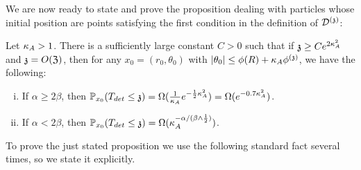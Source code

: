 We are now ready to state and prove the proposition dealing with particles whose initial position are points satisfying the first condition in the definition of $\dt$:
\begin{proposition}\label{mixedLowerBoundschico}
Let $\KA > 1$. There is a sufficiently large constant $C>0$ such that if $\ss\ge Ce^{2\KA^2}$ and $\ss=O(\mathfrak{Z})$, then for any $x_0=(r_0, \theta_0)$ with $|\theta_0| \le \phi(R)+\KA \phis$, we have the following: 
\begin{enumerate}[(i)]

\item\label{mixedLowerBoundschico:imt1}  If $\alpha \ge 2\beta$, then $\displaystyle 
\PP_{x_0}(T_{det} \leq \ss)=\Omega(\tfrac{1}{\KA}e^{-\frac12\KA^2}) =\Omega(e^{-0.7\KA^2})$. %

\item\label{mixedLowerBoundschico:imt2} 
If $\alpha < 2\beta$, then %
$\displaystyle
\PP_{x_0}(T_{det} \leq \ss) = \Omega(\KA^{-\alpha/(\beta\wedge\frac12)})$.
\end{enumerate}
\end{proposition}
To prove the just stated proposition we use the following standard fact several times, so we state it explicitly.
